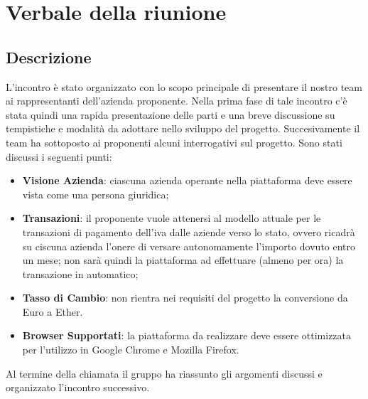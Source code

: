\section{Verbale della riunione}

\subsection{Descrizione}
L'incontro è stato organizzato con lo scopo principale di presentare il nostro team ai rappresentanti dell'azienda proponente. Nella prima fase di tale incontro c'è stata quindi una rapida presentazione delle parti e una breve discussione su tempistiche e modalità da adottare nello sviluppo del progetto. Succesivamente il team ha sottoposto ai proponenti alcuni interrogativi sul progetto.
Sono stati discussi i seguenti punti: 
\begin{itemize}
	\item \textbf{Visione Azienda}: ciascuna azienda operante nella piattaforma deve essere vista come una persona giuridica;
	\item \textbf{Transazioni}: il proponente vuole attenersi al modello attuale per le transazioni di pagamento dell'iva dalle aziende verso lo stato, ovvero ricadrà su ciscuna azienda l'onere di versare autonomamente l'importo dovuto entro un mese; non sarà quindi la piattaforma ad effettuare (almeno per ora) la transazione in automatico;
	\item \textbf{Tasso di Cambio}: non rientra nei requisiti del progetto la conversione da Euro a Ether.
	\item \textbf{Browser Supportati}: la piattaforma da realizzare deve essere ottimizzata per l'utilizzo in Google Chrome e Mozilla Firefox.

\end{itemize}
Al termine della chiamata il gruppo ha riassunto gli argomenti discussi e organizzato l'incontro successivo.
